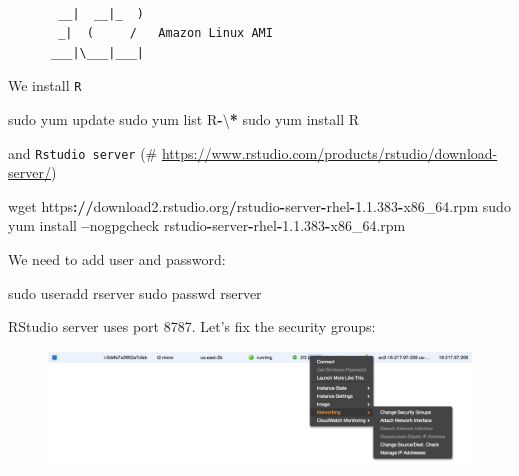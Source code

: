 \documentclass[]{book}
\newenvironment{Shaded}{\begin{snugshade}}{\end{snugshade}}
\newcommand{\DecValTok}[1]{\textcolor[rgb]{0.00,0.00,0.81}{#1}}
\newcommand{\FloatTok}[1]{\textcolor[rgb]{0.00,0.00,0.81}{#1}}
\newcommand{\OperatorTok}[1]{\textcolor[rgb]{0.81,0.36,0.00}{\textbf{#1}}}
\newcommand{\ErrorTok}[1]{\textcolor[rgb]{0.64,0.00,0.00}{\textbf{#1}}}
\newcommand{\NormalTok}[1]{#1}
\theoremstyle{definition}
\theoremstyle{definition}
\theoremstyle{definition}
\theoremstyle{remark}
\begin{document}
\begin{verbatim}

       __|  __|_  )
       _|  (     /   Amazon Linux AMI
      ___|\___|___|
\end{verbatim}

We install \texttt{R}

\begin{Shaded}
\begin{Highlighting}[]
\NormalTok{sudo yum update}
\NormalTok{sudo yum list R}\OperatorTok{-}\NormalTok{\textbackslash{}}\OperatorTok{*}
\NormalTok{sudo yum install R}
\end{Highlighting}
\end{Shaded}

and \texttt{Rstudio\ server} (\#
\url{https://www.rstudio.com/products/rstudio/download-server/})

\begin{Shaded}
\begin{Highlighting}[]
\NormalTok{wget https}\OperatorTok{:}\ErrorTok{//}\NormalTok{download2.rstudio.org}\OperatorTok{/}\NormalTok{rstudio}\OperatorTok{-}\NormalTok{server}\OperatorTok{-}\NormalTok{rhel}\OperatorTok{-}\FloatTok{1.1}\NormalTok{.}\DecValTok{383}\OperatorTok{-}\NormalTok{x86_}\FloatTok{64.}\NormalTok{rpm}
\NormalTok{sudo yum install }\OperatorTok{--}\NormalTok{nogpgcheck rstudio}\OperatorTok{-}\NormalTok{server}\OperatorTok{-}\NormalTok{rhel}\OperatorTok{-}\FloatTok{1.1}\NormalTok{.}\DecValTok{383}\OperatorTok{-}\NormalTok{x86_}\FloatTok{64.}\NormalTok{rpm}
\end{Highlighting}
\end{Shaded}

We need to add user and password:

\begin{Shaded}
\begin{Highlighting}[]
\NormalTok{sudo useradd rserver}
\NormalTok{sudo passwd rserver}
\end{Highlighting}
\end{Shaded}

RStudio server uses port 8787. Let's fix the security groups:

\begin{figure}

{\centering \includegraphics[width=33.28in]{images/ch6_aws_change_security_groups} 

}

\end{figure}
\end{document}
